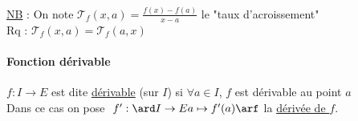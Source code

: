     \\{\small \underline{NB} : On note $\mathcal{T}_f(x,a) = \frac{f(x) - f(a)}{x-a}$ le "taux d'acroissement"\\ 
    Rq : $\mathcal{T}_f(x,a) = \mathcal{T}_f(a,x)$
    \newpage ${}$ \\ 
    \traitd
    \paragraph{Fonction dérivable}
        $f:I\rightarrow E$ est dite \underline{dérivable} (sur $I$) si $\forall a\in I$, $f$ est dérivable au point $a$\\
        Dans ce cas on pose $~f':\ard I\rightarrow E \\ a\mapsto f'(a) \arf$ la \underline{dérivée de $f$}.\trait ${}$ \vspace*{-1.5cm} \\ 					\traitd
}
